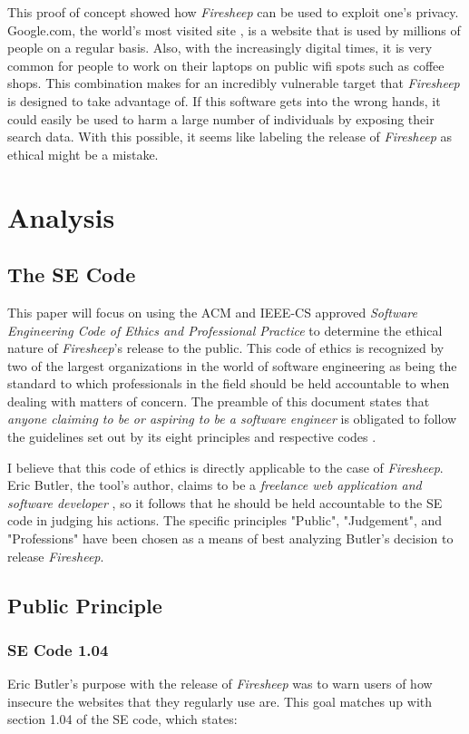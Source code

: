 \documentclass[11pt]{article}
\begin{document}
\begin{multicols}{2}
This proof of concept showed how \emph{Firesheep} can be used to exploit one's privacy. Google.com, the world's most visited site \cite{alexa}, is a website that is used by millions of people on a regular basis. Also, with the increasingly digital times, it is very common for people to work on their laptops on public wifi spots such as coffee shops. This combination makes for an incredibly vulnerable target that \emph{Firesheep} is designed to take advantage of. If this software gets into the wrong hands, it could easily be used to harm a large number of individuals by exposing their search data. With this possible, it seems like labeling the release of \emph{Firesheep} as ethical might be a mistake. 

\section{Analysis}
\subsection{The SE Code}
This paper will focus on using the ACM and IEEE-CS approved \emph{Software Engineering Code of Ethics and Professional Practice} \cite{se_code} to determine the ethical nature of \emph{Firesheep}'s release to the public. This code of ethics is recognized by two of the largest organizations in the world of software engineering as being the standard to which professionals in the field should be held accountable to when dealing with matters of concern. The preamble of this document states that \emph{anyone claiming to be or aspiring to be a software engineer} is obligated to follow the guidelines set out by its eight principles and respective codes \cite{se_code}.

I believe that this code of ethics is directly applicable to the case of \emph{Firesheep}. Eric Butler, the tool's author, claims to be a \emph{freelance web application and software developer} \cite{codebutler_main}, so it follows that he should be held accountable to the SE code in judging his actions. The specific principles "Public", "Judgement", and "Professions" have been chosen as a means of best analyzing Butler's decision to release \emph{Firesheep}.

\subsection{Public Principle}
\subsubsection{SE Code 1.04}
Eric Butler's purpose with the release of \emph{Firesheep} was to warn users of how insecure the websites that they regularly use are. This goal matches up with section 1.04 of the SE code, which states:


\end{multicols}
\end{document}
